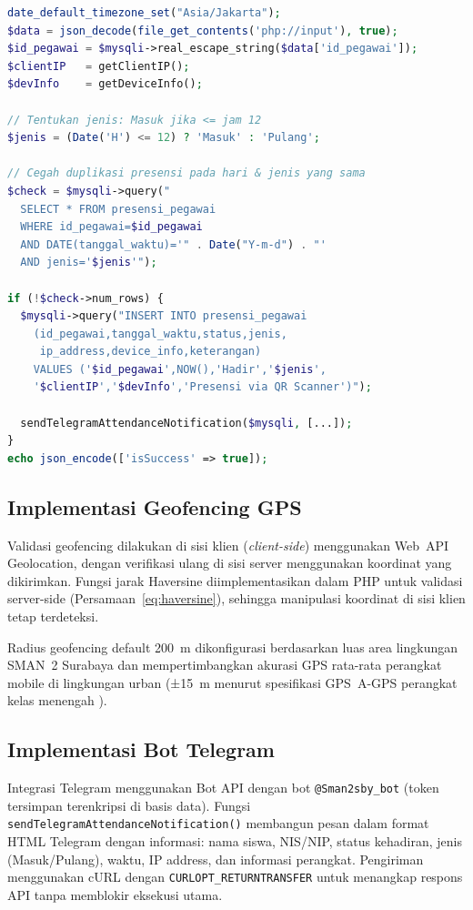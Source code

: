\documentclass[12pt,a4paper]{article}
\begin{document}
\begin{lstlisting}[language=PHP, caption={Logika inti endpoint
  presensi QR (presensi.php, disederhanakan).},
  label={lst:presensi}]
date_default_timezone_set("Asia/Jakarta");
$data = json_decode(file_get_contents('php://input'), true);
$id_pegawai = $mysqli->real_escape_string($data['id_pegawai']);
$clientIP   = getClientIP();
$devInfo    = getDeviceInfo();

// Tentukan jenis: Masuk jika <= jam 12
$jenis = (Date('H') <= 12) ? 'Masuk' : 'Pulang';

// Cegah duplikasi presensi pada hari & jenis yang sama
$check = $mysqli->query("
  SELECT * FROM presensi_pegawai
  WHERE id_pegawai=$id_pegawai
  AND DATE(tanggal_waktu)='" . Date("Y-m-d") . "'
  AND jenis='$jenis'");

if (!$check->num_rows) {
  $mysqli->query("INSERT INTO presensi_pegawai
    (id_pegawai,tanggal_waktu,status,jenis,
     ip_address,device_info,keterangan)
    VALUES ('$id_pegawai',NOW(),'Hadir','$jenis',
    '$clientIP','$devInfo','Presensi via QR Scanner')");

  sendTelegramAttendanceNotification($mysqli, [...]);
}
echo json_encode(['isSuccess' => true]);
\end{lstlisting}

\subsection{Implementasi Geofencing GPS}

Validasi geofencing dilakukan di sisi klien (\textit{client-side})
menggunakan Web~API Geolocation, dengan verifikasi ulang di sisi server
menggunakan koordinat yang dikirimkan.
Fungsi jarak Haversine diimplementasikan dalam PHP untuk validasi
server-side (Persamaan~\ref{eq:haversine}), sehingga manipulasi
koordinat di sisi klien tetap terdeteksi.

Radius geofencing default 200~m dikonfigurasi berdasarkan luas area
lingkungan SMAN~2 Surabaya dan mempertimbangkan akurasi GPS rata-rata
perangkat mobile di lingkungan urban (±15~m menurut spesifikasi
GPS~A-GPS perangkat kelas menengah \citep{zandbergen2011accuracy}).

\subsection{Implementasi Bot Telegram}

Integrasi Telegram menggunakan Bot API dengan bot
\texttt{@Sman2sby\_bot} (token tersimpan terenkripsi di basis data).
Fungsi \texttt{sendTelegramAttendanceNotification()} membangun pesan
dalam format HTML Telegram dengan informasi:
nama siswa, NIS/NIP, status kehadiran, jenis (Masuk/Pulang),
waktu, IP address, dan informasi perangkat.
Pengiriman menggunakan cURL dengan \texttt{CURLOPT\_RETURNTRANSFER}
untuk menangkap respons API tanpa memblokir eksekusi utama.
\end{document}
